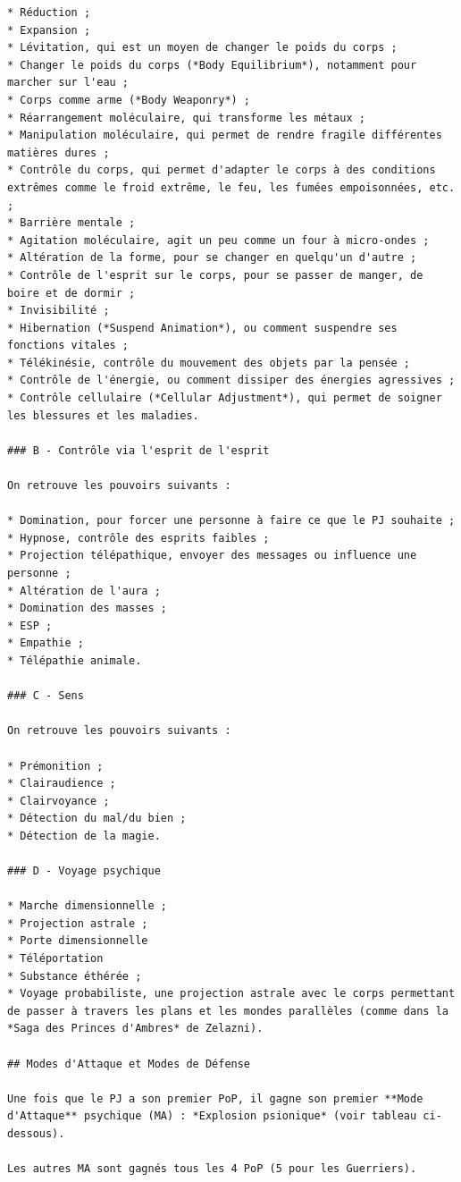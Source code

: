 \documentclass[12pt]{article}
\begin{document}
{\begin{verbatim}
* Réduction ;
* Expansion ;
* Lévitation, qui est un moyen de changer le poids du corps ;
* Changer le poids du corps (*Body Equilibrium*), notamment pour marcher sur l'eau ;
* Corps comme arme (*Body Weaponry*) ;
* Réarrangement moléculaire, qui transforme les métaux ;
* Manipulation moléculaire, qui permet de rendre fragile différentes matières dures ;
* Contrôle du corps, qui permet d'adapter le corps à des conditions extrêmes comme le froid extrême, le feu, les fumées empoisonnées, etc. ;
* Barrière mentale ;
* Agitation moléculaire, agit un peu comme un four à micro-ondes ;
* Altération de la forme, pour se changer en quelqu'un d'autre ;
* Contrôle de l'esprit sur le corps, pour se passer de manger, de boire et de dormir ;
* Invisibilité ;
* Hibernation (*Suspend Animation*), ou comment suspendre ses fonctions vitales ;
* Télékinésie, contrôle du mouvement des objets par la pensée ;
* Contrôle de l'énergie, ou comment dissiper des énergies agressives ;
* Contrôle cellulaire (*Cellular Adjustment*), qui permet de soigner les blessures et les maladies.

### B - Contrôle via l'esprit de l'esprit

On retrouve les pouvoirs suivants :

* Domination, pour forcer une personne à faire ce que le PJ souhaite ;
* Hypnose, contrôle des esprits faibles ;
* Projection télépathique, envoyer des messages ou influence une personne ;
* Altération de l'aura ;
* Domination des masses ;
* ESP ;
* Empathie ;
* Télépathie animale.

### C - Sens

On retrouve les pouvoirs suivants :

* Prémonition ;
* Clairaudience ;
* Clairvoyance ;
* Détection du mal/du bien ;
* Détection de la magie.

### D - Voyage psychique

* Marche dimensionnelle ;
* Projection astrale ;
* Porte dimensionnelle
* Téléportation
* Substance éthérée ;
* Voyage probabiliste, une projection astrale avec le corps permettant de passer à travers les plans et les mondes parallèles (comme dans la *Saga des Princes d'Ambres* de Zelazni).

## Modes d'Attaque et Modes de Défense

Une fois que le PJ a son premier PoP, il gagne son premier **Mode d'Attaque** psychique (MA) : *Explosion psionique* (voir tableau ci-dessous).

Les autres MA sont gagnés tous les 4 PoP (5 pour les Guerriers).


\end{verbatim}}
\end{document}
